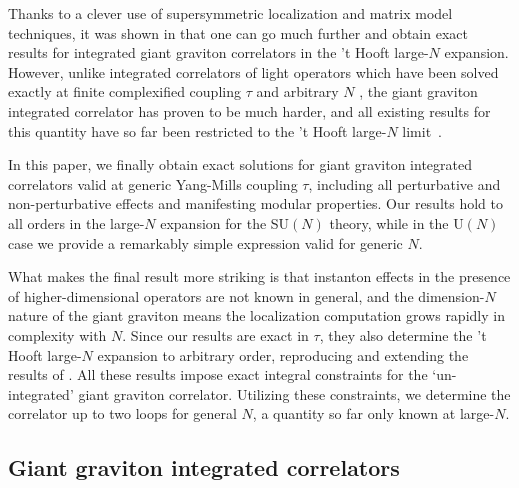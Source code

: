 \documentclass[aps,prl,twocolumn, longbibliography,footinbib,superscriptaddress, preprintnumbers]{revtex4-1}
\newcommand{\<}{\langle}
\renewcommand{\>}{\rangle}
\begin{document}
Thanks to a clever use of supersymmetric localization and matrix model techniques, it was shown in \cite{Brown:2024tru} that   one can go much further and obtain exact results for  integrated giant graviton correlators in the ’t Hooft large-$N$ expansion.
However, unlike integrated correlators of light operators which have been solved exactly at finite complexified coupling $\tau$ and arbitrary $N$ \cite{Dorigoni:2021guq, Dorigoni:2021bvj, Dorigoni:2022cua}, the giant graviton integrated correlator has proven to be much harder, and all existing results for this quantity have so far been restricted to the ’t Hooft large-$N$ limit~\cite{Brown:2024tru, Brown:2025huy}.

In this paper, we finally obtain exact solutions for giant graviton integrated correlators valid at generic Yang-Mills coupling $\tau$, including all perturbative and non-perturbative effects and manifesting  modular properties. Our results hold to all orders in the large-$N$ expansion for the SU$(N)$ theory, while in the U$(N)$ case we provide a remarkably simple expression valid for generic $N$.

What makes the final result more striking is that  instanton effects in the presence of higher-dimensional operators are not known in general, and the dimension-$N$ nature of the giant graviton means the localization  computation grows rapidly in complexity with $N$. Since our results are exact in $\tau$, they also determine the ’t Hooft large-$N$ expansion to arbitrary order, reproducing and extending the results of \cite{Brown:2024tru}. All these results impose exact integral constraints for the `un-integrated' giant graviton correlator. Utilizing  these constraints, we determine the correlator up to two loops for general $N$, a quantity so far only known at large-$N$.


\vspace{-0.56cm}
\subsection{Giant graviton integrated correlators}
\vspace{-0.2cm}
\end{document}
